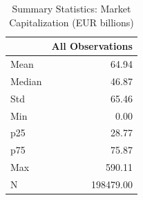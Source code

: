 \begin{table}
\caption{Summary Statistics: Market Capitalization (EUR billions)}
\label{tab:equity_summary}
\begin{tabular}{lr}
\toprule
 & All Observations \\
\midrule
Mean & 64.94 \\
Median & 46.87 \\
Std & 65.46 \\
Min & 0.00 \\
p25 & 28.77 \\
p75 & 75.87 \\
Max & 590.11 \\
N & 198479.00 \\
\bottomrule
\end{tabular}
\end{table}
